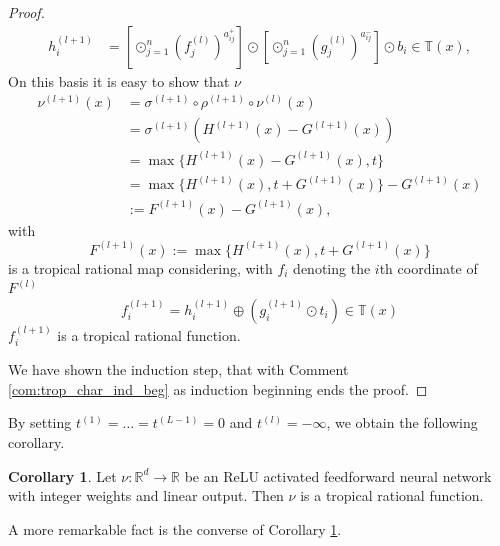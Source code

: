 \documentclass{article}
\theoremstyle{definition}
\newtheorem{corollary}[theorem]{Corollary}
\newtheorem{comment}[theorem]{Comment}
\begin{document}
\begin{proof}
\begin{align*}
h_{i}^{(l+1)} &= [\odot^{n}_{j=1}(f_j^{(l)})^{a_{ij}^{+}}] \odot [\odot^{n}_{j=1}(g_j^{(l)})^{a_{ij}^{-}}] \odot b_{i} \in \mathbb{T}(x),
\end{align*}
On this basis it is easy to show that $\nu$
\begin{align*}
\nu^{(l+1)}(x) 
&= \sigma^{(l+1)} \circ \rho^{(l+1)} \circ \nu^{(l)}(x) \\
&= \sigma^{(l+1)} (H^{(l+1)}(x) - G^{(l+1)}(x)) \\
&= \max\{ H^{(l+1)}(x) - G^{(l+1)}(x), t\} \\
&= \max\{ H^{(l+1)}(x), t + G^{(l+1)}(x)\} - G^{(l+1)}(x) \\
&:= F^{(l+1)}(x) - G^{(l+1)}(x),
\end{align*}
with
$$F^{(l+1)}(x) := \max\{ H^{(l+1)}(x), t + G^{(l+1)}(x)\}$$
is a tropical rational map considering, with $f_{i}$ denoting the $i$th coordinate of $F^{(l)}$
$$f_{i}^{(l+1)} = h_{i}^{(l+1)} \oplus (g_{i}^{(l+1)} \odot t_{i}) \in \mathbb{T}(x)$$
$f_{i}^{(l+1)}$ is a tropical rational function.

We have shown the induction step, that with Comment \ref{com:trop_char_ind_beg} as induction beginning ends the proof.
\end{proof}

By setting $t^{(1)} = \dots = t^{(L-1)} = 0$ and $t^{(l)} = - \infty$, we obtain the following corollary.

\begin{corollary}\cite{zhang2018tropical}
\label{cor:relu_trop_rat_fkt}
Let $\nu : \mathbb{R}^{d} \to \mathbb{R}$ be an ReLU activated feedforward neural network with integer weights and linear output. Then $\nu$ is a tropical rational function.
\end{corollary}

A more remarkable fact is the converse of Corollary \ref{cor:relu_trop_rat_fkt}.
\end{document}
